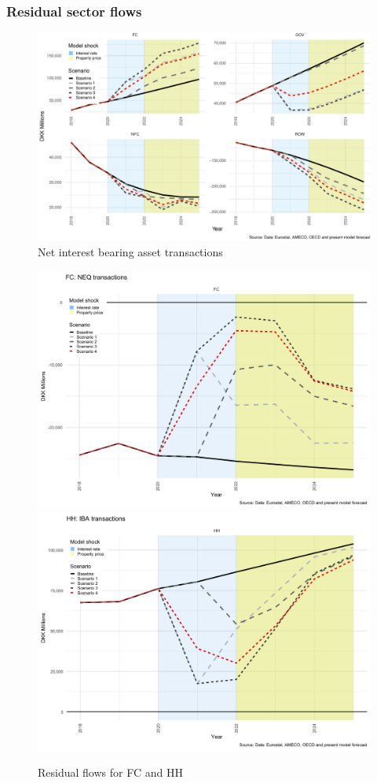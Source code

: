 \documentclass[
]{book}
\begin{document}
\hypertarget{residual-sector-flows}{%
\subsubsection{Residual sector flows}\label{residual-sector-flows}}

\begin{figure}
\centering
\includegraphics{figures/fl-fi-sfc-NIB-extra-1.pdf}
\caption{\label{fig:fl-fi-sfc-NIB-extra}Net interest bearing asset transactions}
\end{figure}

\begin{figure}[H]
\includegraphics[width=0.5\linewidth]{figures/fl-fi-sfc-passive-FC-HH-1} \includegraphics[width=0.5\linewidth]{figures/fl-fi-sfc-passive-FC-HH-2} \caption{Residual flows for FC and HH}\label{fig:fl-fi-sfc-passive-FC-HH}
\end{figure}
\end{document}
